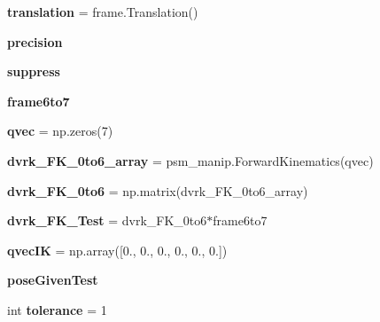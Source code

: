 \begin{DoxyCompactItemize}
\item 
{\bfseries translation} = frame.\+Translation()\hypertarget{namespacecisstPythonTest__org_aee377bd698b17682d53804db60294ecf}{}\label{namespacecisstPythonTest__org_aee377bd698b17682d53804db60294ecf}

\item 
{\bfseries precision}\hypertarget{namespacecisstPythonTest__org_a0301d619536d627d6dcea33d6b3a1941}{}\label{namespacecisstPythonTest__org_a0301d619536d627d6dcea33d6b3a1941}

\item 
{\bfseries suppress}\hypertarget{namespacecisstPythonTest__org_ad25167638b1522b0ca55cfc59823fe5f}{}\label{namespacecisstPythonTest__org_ad25167638b1522b0ca55cfc59823fe5f}

\item 
{\bfseries frame6to7}
\item 
{\bfseries qvec} = np.\+zeros(7)\hypertarget{namespacecisstPythonTest__org_a5d146b83f757252753e8f0313adf481d}{}\label{namespacecisstPythonTest__org_a5d146b83f757252753e8f0313adf481d}

\item 
{\bfseries dvrk\+\_\+\+F\+K\+\_\+0to6\+\_\+array} = psm\+\_\+manip.\+Forward\+Kinematics(qvec)\hypertarget{namespacecisstPythonTest__org_af14cfaf6dcc6d871f0fdd4d2aad11f26}{}\label{namespacecisstPythonTest__org_af14cfaf6dcc6d871f0fdd4d2aad11f26}

\item 
{\bfseries dvrk\+\_\+\+F\+K\+\_\+0to6} = np.\+matrix(dvrk\+\_\+\+F\+K\+\_\+0to6\+\_\+array)\hypertarget{namespacecisstPythonTest__org_a10ae6475b71b18360abe86e0d52de9aa}{}\label{namespacecisstPythonTest__org_a10ae6475b71b18360abe86e0d52de9aa}

\item 
{\bfseries dvrk\+\_\+\+F\+K\+\_\+\+Test} = dvrk\+\_\+\+F\+K\+\_\+0to6$\ast$frame6to7\hypertarget{namespacecisstPythonTest__org_a444935432c3f2a3c2d8955c48fc85f64}{}\label{namespacecisstPythonTest__org_a444935432c3f2a3c2d8955c48fc85f64}

\item 
{\bfseries qvec\+IK} = np.\+array(\mbox{[}0., 0., 0., 0., 0., 0.\mbox{]})\hypertarget{namespacecisstPythonTest__org_aa4d86665c4ea6f7cf9bf0c046b4362f3}{}\label{namespacecisstPythonTest__org_aa4d86665c4ea6f7cf9bf0c046b4362f3}

\item 
{\bfseries pose\+Given\+Test}
\item 
int {\bfseries tolerance} = 1\hypertarget{namespacecisstPythonTest__org_a94231b906834eb3169fb6aa368d41602}{}\label{namespacecisstPythonTest__org_a94231b906834eb3169fb6aa368d41602}


\end{DoxyCompactItemize}
